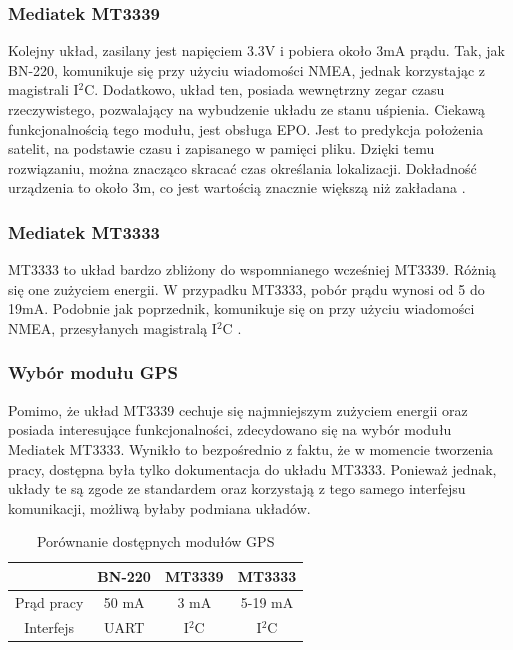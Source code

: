 \subsubsection{Mediatek MT3339}
Kolejny układ, zasilany jest napięciem 3.3V i pobiera około 3mA prądu. Tak, jak BN-220, komunikuje się przy użyciu wiadomości NMEA, jednak korzystając z magistrali I$^{2}$C. Dodatkowo, układ ten, posiada wewnętrzny zegar czasu rzeczywistego, pozwalający na wybudzenie układu ze stanu uśpienia. Ciekawą funkcjonalnością tego modułu, jest obsługa EPO. Jest to predykcja położenia satelit, na podstawie czasu i zapisanego w pamięci pliku. Dzięki temu rozwiązaniu, można znacząco skracać czas określania lokalizacji. Dokładność urządzenia to około 3m, co jest wartością znacznie większą niż zakładana \cite{MT3339}.

\subsubsection{Mediatek MT3333}
MT3333 to układ bardzo zbliżony do wspomnianego wcześniej MT3339. Różnią się one zużyciem energii. W przypadku MT3333, pobór prądu wynosi od 5 do 19mA. Podobnie jak poprzednik, komunikuje się on przy użyciu wiadomości NMEA, przesyłanych magistralą I$^{2}$C \cite{MT3333}.

\subsubsection{Wybór modułu GPS}
Pomimo, że układ MT3339 cechuje się najmniejszym zużyciem energii oraz posiada interesujące funkcjonalności, zdecydowano się na wybór modułu Mediatek MT3333. Wynikło to bezpośrednio z faktu, że w momencie tworzenia pracy, dostępna była tylko dokumentacja do układu MT3333. Ponieważ jednak, układy te są zgode ze standardem oraz korzystają z tego samego interfejsu komunikacji, możliwą byłaby podmiana układów.

\begin{table}[h]
    \centering
    \begin{tabular}{|c | c | c | c|}
        \hline
         & BN-220 & MT3339 & MT3333 \\
        \hline
        Prąd pracy  & 50 mA & 3 mA &5-19 mA \\
        \hline
        Interfejs & UART & I$^{2}$C & I$^{2}$C\\
        \hline
    \end{tabular}
    \caption{Porównanie dostępnych modułów GPS}
    \label{tab:gps}
    \end{table}


